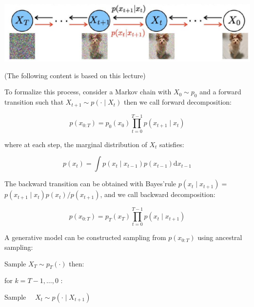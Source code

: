 \documentclass[10pt]{article}
\begin{document}
\begin{center}
\includegraphics[max width=\textwidth]{2024_01_08_a381fc3992661ee7020eg-13}
\end{center}

(The following content is based on this lecture)

To formalize this process, consider a Markov chain with $X_{0} \sim p_{0}$ and a forward transition such that $X_{t+1} \sim p\left(\cdot \mid X_{t}\right)$ then we call forward decomposition:

$$
p\left(x_{0: T}\right)=p_{0}\left(x_{0}\right) \prod_{t=0}^{T-1} p\left(x_{t+1} \mid x_{t}\right)
$$

where at each step, the marginal distribution of $X_{t}$ satisfies:

$$
p\left(x_{t}\right)=\int p\left(x_{t} \mid x_{t-1}\right) p\left(x_{t-1}\right) \mathrm{d} x_{t-1}
$$

The backward transition can be obtained with Bayes'rule $p\left(x_{t} \mid x_{t+1}\right)=$ $p\left(x_{t+1} \mid x_{t}\right) p\left(x_{t}\right) / p\left(x_{t+1}\right)$, and we call backward decomposition:

$$
p\left(x_{0: T}\right)=p_{T}\left(x_{T}\right) \prod_{t=0}^{T-1} p\left(x_{t} \mid x_{t+1}\right)
$$

A generative model can be constructed sampling from $p\left(x_{0: T}\right)$ using ancestral sampling:

Sample $X_{T} \sim p_{T}(\cdot)$ then:

for $k=T-1, \ldots, 0$ :

Sample $\quad X_{t} \sim p\left(\cdot \mid X_{t+1}\right)$
\end{document}
